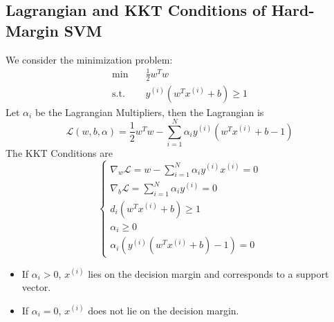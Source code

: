     \subsection{Lagrangian and KKT Conditions of Hard-Margin SVM}
        We consider the minimization problem:
        \begin{align*}
             \min \quad &\frac{1}{2}w^Tw\\
             \text{s.t.} \quad & y^{(i)}(w^Tx^{(i)}+b) \ge 1
        \end{align*}
        Let $\alpha_i$ be the Lagrangian Multipliers, then the Lagrangian is
        \[ \mathcal{L}(w,b,\alpha) = \frac{1}{2}w^Tw - \sum_{i=1}^N \alpha_i y^{(i)}(w^Tx^{(i)} + b - 1) \]
        The KKT Conditions are
        \[
        \begin{cases}
            \nabla_w \mathcal{L} = w - \sum_{i=1}^N \alpha_i y^{(i)}x^{(i)} = 0\\
            \nabla_b \mathcal{L} = \sum_{i=1}^N \alpha_i y^{(i)} = 0\\
            d_i(w^Tx^{(i)} + b) \ge 1\\
            \alpha_i \ge 0\\
            \alpha_i(y^{(i)}(w^Tx^{(i)} + b) - 1) =0
        \end{cases}    
        \]
        \begin{remark}
            \begin{itemize}
                \item If $\alpha_i > 0$, $x^{(i)}$ lies on the decision margin and corresponds to a support vector.
                \item If $\alpha_i = 0$, $x^{(i)}$ does not lie on the decision margin.
            \end{itemize}
        \end{remark}

